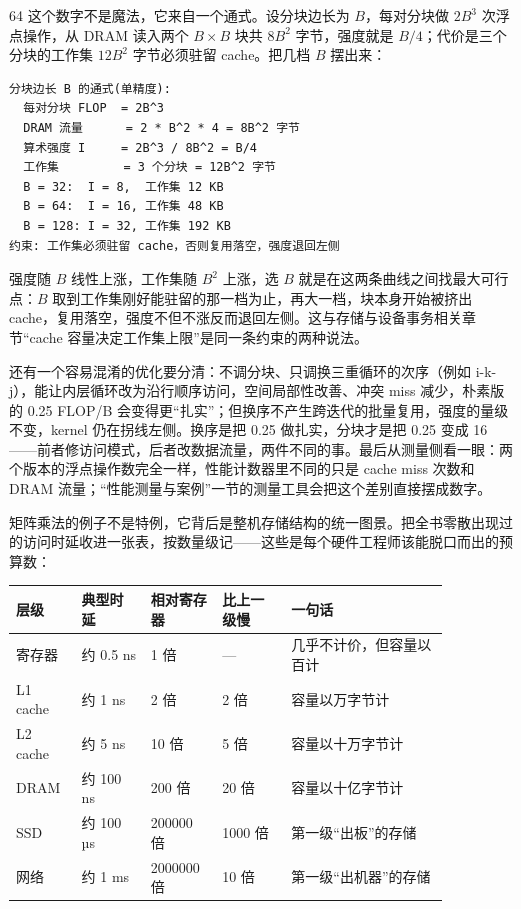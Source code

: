 64 这个数字不是魔法，它来自一个通式。设分块边长为 $B$，每对分块做 $2B^3$ 次浮点操作，从 DRAM 读入两个 $B\times B$ 块共 $8B^2$ 字节，强度就是 $B/4$；代价是三个分块的工作集 $12B^2$ 字节必须驻留 cache。把几档 $B$ 摆出来：

\begin{lstlisting}
分块边长 B 的通式(单精度):
  每对分块 FLOP  = 2B^3
  DRAM 流量      = 2 * B^2 * 4 = 8B^2 字节
  算术强度 I     = 2B^3 / 8B^2 = B/4
  工作集         = 3 个分块 = 12B^2 字节
  B = 32:  I = 8,  工作集 12 KB
  B = 64:  I = 16, 工作集 48 KB
  B = 128: I = 32, 工作集 192 KB
约束: 工作集必须驻留 cache，否则复用落空，强度退回左侧
\end{lstlisting}

强度随 $B$ 线性上涨，工作集随 $B^2$ 上涨，选 $B$ 就是在这两条曲线之间找最大可行点：$B$ 取到工作集刚好能驻留的那一档为止，再大一档，块本身开始被挤出 cache，复用落空，强度不但不涨反而退回左侧。这与存储与设备事务相关章节“cache 容量决定工作集上限”是同一条约束的两种说法。

还有一个容易混淆的优化要分清：不调分块、只调换三重循环的次序（例如 i-k-j），能让内层循环改为沿行顺序访问，空间局部性改善、冲突 miss 减少，朴素版的 0.25 FLOP/B 会变得更“扎实”；但换序不产生跨迭代的批量复用，强度的量级不变，kernel 仍在拐线左侧。换序是把 0.25 做扎实，分块才是把 0.25 变成 16——前者修访问模式，后者改数据流量，两件不同的事。最后从测量侧看一眼：两个版本的浮点操作数完全一样，性能计数器里不同的只是 cache miss 次数和 DRAM 流量；“性能测量与案例”一节的测量工具会把这个差别直接摆成数字。

矩阵乘法的例子不是特例，它背后是整机存储结构的统一图景。把全书零散出现过的访问时延收进一张表，按数量级记——这些是每个硬件工程师该能脱口而出的预算数：

\begin{longtable}{L{0.12\linewidth}L{0.14\linewidth}L{0.14\linewidth}L{0.14\linewidth}L{0.32\linewidth}}
\toprule
层级 & 典型时延 & 相对寄存器 & 比上一级慢 & 一句话 \\
\midrule
寄存器 & 约 0.5 ns & 1 倍 & — & 几乎不计价，但容量以百计 \\\tablerowrule
L1 cache & 约 1 ns & 2 倍 & 2 倍 & 容量以万字节计 \\\tablerowrule
L2 cache & 约 5 ns & 10 倍 & 5 倍 & 容量以十万字节计 \\\tablerowrule
DRAM & 约 100 ns & 200 倍 & 20 倍 & 容量以十亿字节计 \\\tablerowrule
SSD & 约 100 µs & 200000 倍 & 1000 倍 & 第一级“出板”的存储 \\\tablerowrule
网络 & 约 1 ms & 2000000 倍 & 10 倍 & 第一级“出机器”的存储 \\
\bottomrule
\end{longtable}

